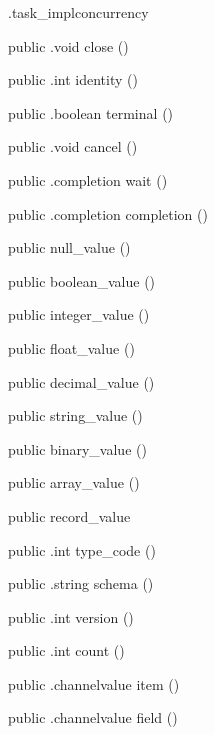 \begin{CrexxClass}{.task\_impl}{concurrency}
\begin{Members}
    \Method
      {public}
      {.void}
      {close}
      {()}

    \Method
      {public}
      {.int}
      {identity}
      {()}

    \Method
      {public}
      {.boolean}
      {terminal}
      {()}

    \Method
      {public}
      {.void}
      {cancel}
      {()}

    \Method
      {public}
      {.completion}
      {wait}
      {()}

    \Method
      {public}
      {.completion}
      {completion}
      {()}

    \Factory
      {public}
      {null\_value}
      {()}

    \Factory
      {public}
      {boolean\_value}
      {()}

    \Factory
      {public}
      {integer\_value}
      {()}

    \Factory
      {public}
      {float\_value}
      {()}

    \Factory
      {public}
      {decimal\_value}
      {()}

    \Factory
      {public}
      {string\_value}
      {()}

    \Factory
      {public}
      {binary\_value}
      {()}

    \Factory
      {public}
      {array\_value}
      {()}

    \Factory
      {public}
      {record\_value}
      {}

    \Method
      {public}
      {.int}
      {type\_code}
      {()}

    \Method
      {public}
      {.string}
      {schema}
      {()}

    \Method
      {public}
      {.int}
      {version}
      {()}

    \Method
      {public}
      {.int}
      {count}
      {()}

    \Method
      {public}
      {.channelvalue}
      {item}
      {()}

    \Method
      {public}
      {.channelvalue}
      {field}
      {()}


\end{Members}
\end{CrexxClass}
